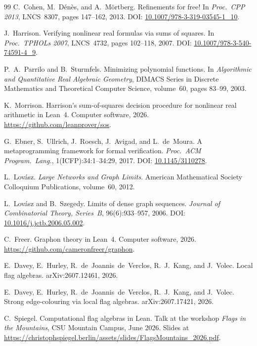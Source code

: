 \documentclass{article}
\newcommand\DOI[1]{DOI: \href{https://doi.org/#1}{#1}}
\begin{document}
\begin{thebibliography}{99}
C.~Cohen, M.~D\'{e}n\`{e}s, and A.~M\"{o}rtberg.
\newblock Refinements for free!
\newblock In \textit{Proc.\ CPP 2013}, LNCS~8307, pages 147--162, 2013.
  \DOI{10.1007/978-3-319-03545-1\_10}.

J.~Harrison.
\newblock Verifying nonlinear real formulas via sums of squares.
\newblock In \textit{Proc.\ TPHOLs 2007}, LNCS~4732, pages 102--118, 2007.
  \DOI{10.1007/978-3-540-74591-4\_9}.

P.~A.~Parrilo and B.~Sturmfels.
\newblock Minimizing polynomial functions.
\newblock In \textit{Algorithmic and Quantitative Real Algebraic Geometry},
  DIMACS Series in Discrete Mathematics and Theoretical Computer Science,
  volume~60, pages 83--99, 2003.

K.~Morrison.
\newblock Harrison's sum-of-squares decision procedure for nonlinear real
  arithmetic in Lean~4.
\newblock Computer software, 2026.
  \url{https://github.com/leanprover/sos}.

G.~Ebner, S.~Ullrich, J.~Roesch, J.~Avigad, and L.~de~Moura.
\newblock A metaprogramming framework for formal verification.
\newblock \textit{Proc.\ ACM Program.\ Lang.}, 1(ICFP):34:1--34:29, 2017.
  \DOI{10.1145/3110278}.

L.~Lov\'{a}sz.
\newblock \textit{Large Networks and Graph Limits}.
\newblock American Mathematical Society Colloquium Publications, volume~60,
  2012.

L.~Lov\'{a}sz and B.~Szegedy.
\newblock Limits of dense graph sequences.
\newblock \textit{Journal of Combinatorial Theory, Series~B}, 96(6):933--957,
  2006.
  \DOI{10.1016/j.jctb.2006.05.002}.

C.~Freer.
\newblock Graphon theory in Lean~4.
\newblock Computer software, 2026.
  \url{https://github.com/cameronfreer/graphon}.

E.~Davey, E.~Hurley, R.~de~Joannis~de~Verclos, R.~J.~Kang, and J.~Volec.
\newblock Local flag algebras.
\newblock arXiv:2607.12461, 2026.

E.~Davey, E.~Hurley, R.~de~Joannis~de~Verclos, R.~J.~Kang, and J.~Volec.
\newblock Strong edge-colouring via local flag algebras.
\newblock arXiv:2607.17421, 2026.

C.~Spiegel.
\newblock Computational flag algebras in Lean.
\newblock Talk at the workshop \textit{Flags in the Mountains}, CSU Mountain
  Campus, June 2026.  Slides at
  \url{https://christophspiegel.berlin/assets/slides/FlagsMountains_2026.pdf}.

\end{thebibliography}
\end{document}
